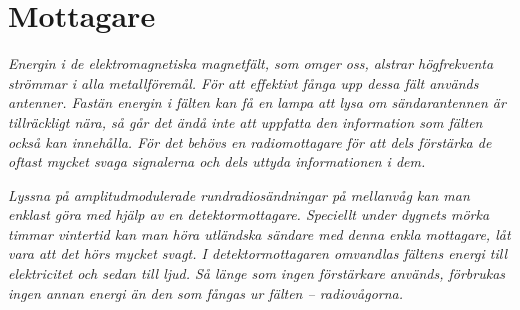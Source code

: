 \section{Mottagare}
\label{mottagare}

\emph{Energin i de elektromagnetiska magnetfält, som omger oss,
  alstrar högfrekventa strömmar i alla metallföremål. För att
  effektivt fånga upp dessa fält används antenner.  Fastän energin i
  fälten kan få en lampa att lysa om sändarantennen är tillräckligt
  nära, så går det ändå inte att uppfatta den information som fälten
  också kan innehålla.  För det behövs en radiomottagare för att dels
  förstärka de oftast mycket svaga signalerna och dels uttyda
  informationen i dem.}

\emph{Lyssna på amplitudmodulerade rundradiosändningar på mellanvåg
  kan man enklast göra med hjälp av en detektormottagare. Speciellt
  under dygnets mörka timmar vintertid kan man höra utländska sändare
  med denna enkla mottagare, låt vara att det hörs mycket svagt. I
  detektormottagaren omvandlas fältens energi till elektricitet och
  sedan till ljud. Så länge som ingen förstärkare används, förbrukas
  ingen annan energi än den som fångas ur fälten -- radiovågorna.}
